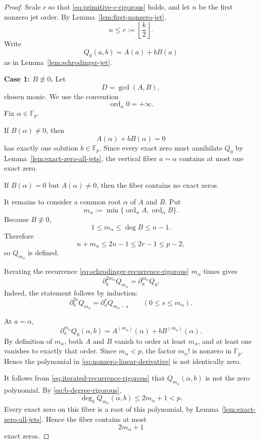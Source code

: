 \documentclass[11pt]{article}
\newcommand{\F}{\mathbb F}
\begin{document}
\begin{proof}
Scale \(c\) so that \eqref{eq:primitive-c-rigorous} holds, and let
\(n\) be the first nonzero jet order.  By
Lemma~\ref{lem:first-nonzero-jet},
\begin{equation}
 n\le r:=\left\lfloor\frac{k}{2}\right\rfloor.
 \label{eq:n-vs-r}
\end{equation}
Write
\[
 Q_0(a,b)=A(a)+bB(a)
\]
as in Lemma~\ref{lem:schrodinger-jet}.

\medskip
\noindent
\textbf{Case 1: \(B\not\equiv0\).}
Let
\[
 D=\gcd(A,B),
\]
chosen monic.  We use the convention
\[
 \operatorname{ord}_\alpha 0=+\infty.
\]
Fix \(\alpha\in\F_p\).

If \(B(\alpha)\ne0\), then
\[
 A(\alpha)+bB(\alpha)=0
\]
has exactly one solution \(b\in\F_p\).  Since every exact zero must
annihilate \(Q_0\) by Lemma~\ref{lem:exact-zero-all-jets}, the vertical
fiber \(a=\alpha\) contains at most one exact zero.

If \(B(\alpha)=0\) but \(A(\alpha)\ne0\), then the fiber contains no
exact zeros.

It remains to consider a common root
\(\alpha\) of \(A\) and \(B\).  Put
\[
 m_\alpha
 :=
 \min\{\operatorname{ord}_\alpha A,
        \operatorname{ord}_\alpha B\}.
\]
Because \(B\not\equiv0\),
\[
 1\le m_\alpha\le\deg B\le n-1.
\]
Therefore
\[
 n+m_\alpha
 \le2n-1
 \le2r-1
 \le p-2,
\]
so \(Q_{m_\alpha}\) is defined.

Iterating the recurrence
\eqref{eq:schrodinger-recurrence-rigorous} \(m_\alpha\) times gives
\begin{equation}
 \partial_b^{2m_\alpha}Q_{m_\alpha}
 =
 \partial_a^{m_\alpha}Q_0.
 \label{eq:iterated-recurrence-rigorous}
\end{equation}
Indeed, the statement follows by induction:
\[
 \partial_b^{2s}Q_{m_\alpha}
 =
 \partial_a^sQ_{m_\alpha-s}
 \qquad(0\le s\le m_\alpha).
\]

At \(a=\alpha\),
\[
 \partial_a^{m_\alpha}Q_0(\alpha,b)
 =
 A^{(m_\alpha)}(\alpha)
 +
 bB^{(m_\alpha)}(\alpha).
 \label{eq:nonzero-linear-derivative}
\]
By definition of \(m_\alpha\), both \(A\) and \(B\) vanish to order at
least \(m_\alpha\), and at least one vanishes to exactly that order.
Since \(m_\alpha<p\), the factor \(m_\alpha!\) is nonzero in \(\F_p\).
Hence the polynomial in
\eqref{eq:nonzero-linear-derivative} is not identically zero.

It follows from \eqref{eq:iterated-recurrence-rigorous} that
\(Q_{m_\alpha}(\alpha,b)\) is not the zero polynomial.  By
\eqref{eq:b-degree-rigorous},
\[
 \deg_bQ_{m_\alpha}(\alpha,b)\le2m_\alpha+1<p.
\]
Every exact zero on this fiber is a root of this polynomial, by
Lemma~\ref{lem:exact-zero-all-jets}.  Hence the fiber contains at most
\begin{equation}
 2m_\alpha+1
 \label{eq:fiber-bound-common-root}
\end{equation}
exact zeros.


\end{proof}
\end{document}
